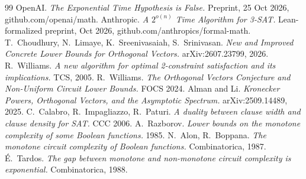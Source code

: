 \documentclass[11pt,a4paper]{article}
\theoremstyle{plain}
\theoremstyle{definition}
\theoremstyle{remark}
\begin{document}
\begin{thebibliography}{99}\small
{} OpenAI. \emph{The Exponential Time Hypothesis is False.} Preprint, 25 Oct 2026, github.com/openai/math.
 Anthropic. \emph{A $2^{o(n)}$ Time Algorithm for 3-SAT.} Lean-formalized preprint, Oct 2026,
  github.com/anthropics/formal-math.
 T.~Choudhury, N.~Limaye, K.~Sreenivasaiah, S.~Srinivasan. \emph{New and Improved Concrete Lower Bounds
  for Orthogonal Vectors.} arXiv:2607.23799, 2026.
 R.~Williams. \emph{A new algorithm for optimal 2-constraint satisfaction and its implications.} TCS, 2005.
 R.~Williams. \emph{The Orthogonal Vectors Conjecture and Non-Uniform Circuit Lower Bounds.} FOCS 2024.
 Alman and Li. \emph{Kronecker Powers, Orthogonal Vectors, and the Asymptotic Spectrum.} arXiv:2509.14489, 2025.
 C.~Calabro, R.~Impagliazzo, R.~Paturi. \emph{A duality between clause width and clause density for SAT.} CCC 2006.
 A.~Razborov. \emph{Lower bounds on the monotone complexity of some Boolean functions.} 1985.
 N.~Alon, R.~Boppana. \emph{The monotone circuit complexity of Boolean functions.} Combinatorica, 1987.
 \'E.~Tardos. \emph{The gap between monotone and non-monotone circuit complexity is exponential.} Combinatorica, 1988.
\end{thebibliography}
\end{document}
